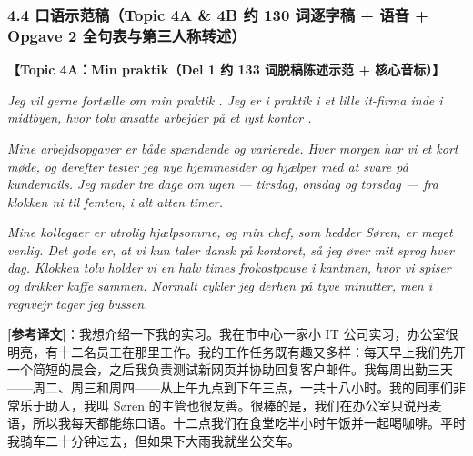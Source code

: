 \subsubsection*{4.4 口语示范稿（Topic 4A \& 4B 约 130 词逐字稿 + 语音 + Opgave 2 全句表与第三人称转述）}

\begin{answerbox}
\textbf{\color{NCDNavy}【Topic 4A：Min praktik（Del 1 约 133 词脱稿陈述示范 + 核心音标）】}

\vspace{0.18em}
\textit{Jeg vil gerne fortælle om min praktik . Jeg er i praktik i et lille it-firma inde i midtbyen, hvor tolv ansatte  arbejder på et lyst kontor .}

\vspace{0.18em}
\textit{Mine arbejdsopgaver er både spændende og varierede. Hver morgen har vi et kort møde, og derefter tester jeg nye hjemmesider og hjælper med at svare på kundemails. Jeg møder tre dage om ugen --- tirsdag, onsdag og torsdag --- fra klokken ni til femten, i alt atten timer.}

\vspace{0.18em}
\textit{Mine kollegaer  er utrolig hjælpsomme, og min chef, som hedder Søren, er meget venlig. Det gode er, at vi kun taler dansk på kontoret, så jeg øver mit sprog hver dag. Klokken tolv holder vi en halv times frokostpause i kantinen, hvor vi spiser og drikker kaffe sammen. Normalt cykler jeg derhen på tyve minutter, men i regnvejr tager jeg bussen.}

\vspace{0.2em}
\small\textbf{[参考译文]}：我想介绍一下我的实习。我在市中心一家小 IT 公司实习，办公室很明亮，有十二名员工在那里工作。我的工作任务既有趣又多样：每天早上我们先开一个简短的晨会，之后我负责测试新网页并协助回复客户邮件。我每周出勤三天——周二、周三和周四——从上午九点到下午三点，一共十八小时。我的同事们非常乐于助人，我叫 Søren 的主管也很友善。很棒的是，我们在办公室只说丹麦语，所以我每天都能练口语。十二点我们在食堂吃半小时午饭并一起喝咖啡。平时我骑车二十分钟过去，但如果下大雨我就坐公交车。


\end{answerbox}
